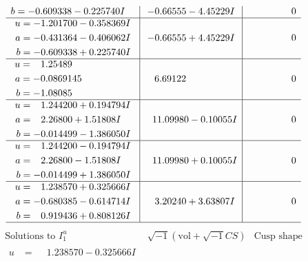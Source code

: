\documentclass[1p]{elsarticle_modified}
\theoremstyle{definition}
\newcommand{\I}{\sqrt{-1}}
\begin{document}
$$\begin{array}{c|c|c}
\begin{aligned}
b &= -0.609338 - 0.225740 I\end{aligned}
 & -0.66555 - 4.45229 I & \phantom{-0.000000 } 0 \\ \hline\begin{aligned}
u &= -1.201700 - 0.358369 I \\
a &= -0.431364 - 0.406062 I \\
b &= -0.609338 + 0.225740 I\end{aligned}
 & -0.66555 + 4.45229 I & \phantom{-0.000000 } 0 \\ \hline\begin{aligned}
u &= \phantom{-}1.25489\phantom{ +0.000000I} \\
a &= -0.0869145\phantom{ +0.000000I} \\
b &= -1.08085\phantom{ +0.000000I}\end{aligned}
 & \phantom{-}6.69122\phantom{ +0.000000I} & \phantom{-0.000000 } 0 \\ \hline\begin{aligned}
u &= \phantom{-}1.244200 + 0.194794 I \\
a &= \phantom{-}2.26800 + 1.51808 I \\
b &= -0.014499 - 1.386050 I\end{aligned}
 & \phantom{-}11.09980 - 0.10055 I & \phantom{-0.000000 } 0 \\ \hline\begin{aligned}
u &= \phantom{-}1.244200 - 0.194794 I \\
a &= \phantom{-}2.26800 - 1.51808 I \\
b &= -0.014499 + 1.386050 I\end{aligned}
 & \phantom{-}11.09980 + 0.10055 I & \phantom{-0.000000 } 0 \\ \hline\begin{aligned}
u &= \phantom{-}1.238570 + 0.325666 I \\
a &= -0.680385 - 0.614714 I \\
b &= \phantom{-}0.919436 + 0.808126 I\end{aligned}
 & \phantom{-}3.20240 + 3.63807 I & \phantom{-0.000000 } 0\\
 \hline 
 \end{array}$$\newpage$$\begin{array}{c|c|c}  
\text{Solutions to }I^u_{1}& \I (\text{vol} + \sqrt{-1}CS) & \text{Cusp shape}\\
 \hline 
\begin{aligned}
u &= \phantom{-}1.238570 - 0.325666 I \\

\end{aligned}
\end{array}$$
\end{document}
